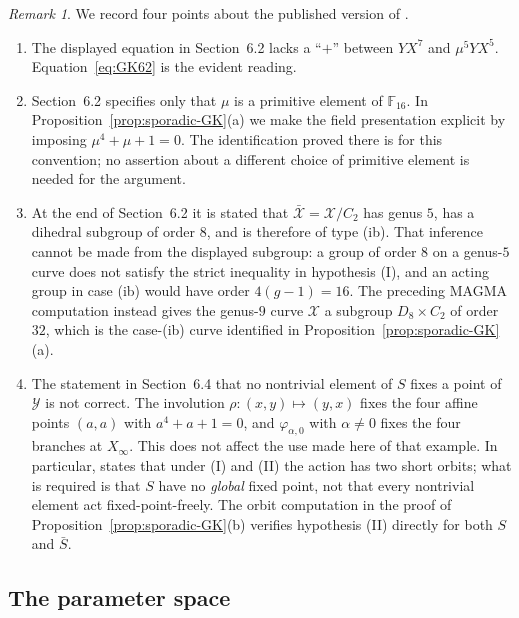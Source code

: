 \documentclass[11pt]{article}
\theoremstyle{remark}
\newtheorem{remark}[theorem]{Remark}
\newcommand{\F}{\mathbb F}
\begin{document}
\begin{remark}\label{rem:GK-caveats}
We record four points about the published version of \cite{GK2015}.
\begin{enumerate}[label=\textup{(\arabic*)}]
\item The displayed equation in Section~6.2 lacks a ``$+$'' between
$YX^7$ and $\mu^5YX^5$.  Equation~\eqref{eq:GK62} is the evident reading.

\item Section~6.2 specifies only that $\mu$ is a primitive element of
$\F_{16}$.  In Proposition~\ref{prop:sporadic-GK}(a) we make the field
presentation explicit by imposing $\mu^4+\mu+1=0$.  The identification
proved there is for this convention; no assertion about a different
choice of primitive element is needed for the argument.

\item At the end of Section~6.2 it is stated that
$\bar{\mathcal X}=\mathcal X/C_2$ has genus $5$, has a dihedral subgroup
of order $8$, and is therefore of type \textup{(ib)}.  That inference
cannot be made from the displayed subgroup: a group of order $8$ on a
genus-$5$ curve does not satisfy the strict inequality in hypothesis
\textup{(I)}, and an acting group in case \textup{(ib)} would have order
$4(g-1)=16$.  The preceding MAGMA computation instead gives the genus-$9$
curve
$\mathcal X$ a subgroup $D_8\times C_2$ of order $32$, which is the
case-\textup{(ib)} curve identified in
Proposition~\ref{prop:sporadic-GK}(a).

\item The statement in Section~6.4 that no nontrivial element of $S$
fixes a point of $\mathcal Y$ is not correct.  The involution
$\rho:(x,y)\mapsto(y,x)$ fixes the four affine points $(a,a)$ with
$a^4+a+1=0$, and $\varphi_{\alpha,0}$ with $\alpha\ne0$ fixes the four
branches at $X_\infty$.  This does not affect the use made here of that
example.  In particular, \cite[Lemma~3.2]{GK2015} states that under
\textup{(I)} and \textup{(II)} the action has two short orbits; what is
required is that $S$ have no \emph{global} fixed point, not that every
nontrivial element act fixed-point-freely.  The orbit computation in the
proof of Proposition~\ref{prop:sporadic-GK}(b) verifies hypothesis
\textup{(II)} directly for both $S$ and $\bar S$.
\end{enumerate}
\end{remark}

\subsection{The parameter space}
\end{document}
